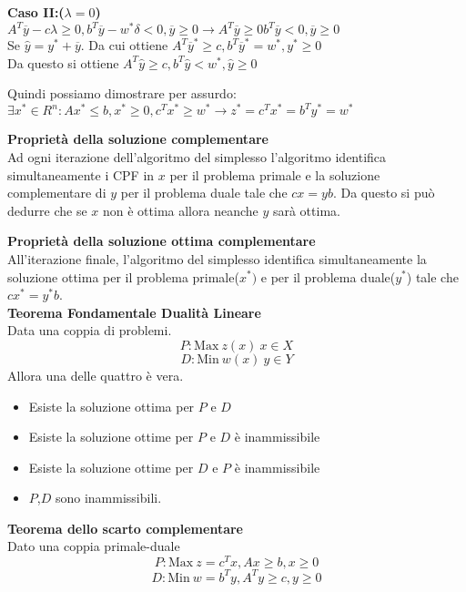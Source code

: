 \documentclass{article}
\begin{document}
\begin{tcolorbox}[
    colback=lightgray,
    colframe=black,
    coltext=black,
    title=Dimostrazione,
    colbacktitle=black,
    coltitle=lightgray,
    breakable
  ]
  \textbf{Caso II:($\lambda = 0$)}\\
  $A^T\overline{y}-c\lambda \ge 0, b^T\overline{y}-w^{\ast}\delta<0, \overline{y} \ge 0 \rightarrow A^T\overline{y} \ge 0 b^T\overline{y}<0, \overline{y} \ge 0$\\
  Se $\hat{y}=y^{\ast}+\overline{y}$. Da cui ottiene $A^T\overline{y}^{\ast} \ge c, b^T\overline{y}^{\ast}=w^{\ast}, y^{\ast}\ge 0$\\
  Da questo si ottiene $A^T\hat{y}\ge c, b^T\hat{y} < w^{\ast}, \hat{y}\ge 0$

  Quindi possiamo dimostrare per assurdo: $\exists x^{\ast} \in R^n: Ax^{\ast} \le b, x^{\ast} \ge 0, c^Tx^{\ast}\ge w^{\ast} \to z^{\ast}=c^Tx^{\ast}=b^Ty^{\ast}=w^{\ast}$
\end{tcolorbox}

\textbf{Proprietà della soluzione complementare}\\
Ad ogni iterazione dell'algoritmo del simplesso l'algoritmo identifica simultaneamente i CPF in $x$ per il problema primale e la soluzione complementare di $y$ per il problema duale tale che $cx=yb$. Da questo si può dedurre che se $x$ non è ottima allora neanche $y$ sarà ottima.

\textbf{Proprietà della soluzione ottima complementare}\\
All'iterazione finale, l'algoritmo del simplesso identifica simultaneamente la soluzione ottima per il problema primale($x^{\ast})$ e per il problema duale($y^{\ast}$) tale che $cx^{\ast}=y^{\ast}b$.\\

\textbf{Teorema Fondamentale Dualità Lineare}\\
Data una coppia di problemi.\\
$$ P: \text{Max}\ z(x)\ x \in X$$
$$D: \text{Min}\ w(x)\ y \in Y$$
Allora una delle quattro è vera.
\begin{itemize}
  \item Esiste la soluzione ottima per $P$ e $D$
  \item Esiste la soluzione ottime per $P$ e $D$ è inammissibile
  \item Esiste la soluzione ottime per $D$ e $P$ è inammissibile
  \item $P$,$D$ sono inammissibili.
\end{itemize}

\textbf{Teorema dello scarto complementare}\\
Dato una coppia primale-duale\\
$$P: \text{Max}\ z=c^Tx, Ax \ge b, x \ge 0$$
$$D: \text{Min}\ w=b^Ty, A^Ty \ge c, y \ge 0$$
\end{document}
